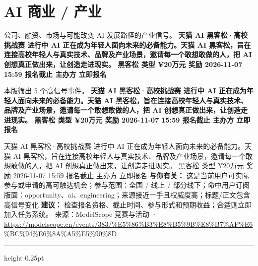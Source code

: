 \documentclass[10.5pt]{ctexart}
\begin{document}
\section*{AI 商业 / 产业}
{\color{ormuted} 公司、融资、市场与可能改变 AI 发展路径的产业信号。}
\vspace{2mm}
{\LARGE\bfseries 天猫 AI 黑客松·高校挑战赛 进行中 AI 正在成为年轻人面向未来的必备能力。天猫 AI 黑客松，旨在连接高校年轻人与真实技术、品牌及产业场景，邀请每一个敢想敢做的人，把 AI 创想真正做出来，让创造走进现实。 黑客松 类型 ¥20万元 奖励 2026-11-07 15:59 报名截止 主办方 立即报名}\par
\vspace{1mm}
{\color{ormuted} 本版筛出 5 个高信号事件。}
\vspace{3mm}
{\Large\bfseries 天猫 AI 黑客松·高校挑战赛 进行中 AI 正在成为年轻人面向未来的必备能力。天猫 AI 黑客松，旨在连接高校年轻人与真实技术、品牌及产业场景，邀请每一个敢想敢做的人，把 AI 创想真正做出来，让创造走进现实。 黑客松 类型 ¥20万元 奖励 2026-11-07 15:59 报名截止 主办方 立即报名}\par
天猫 AI 黑客松·高校挑战赛 进行中 AI 正在成为年轻人面向未来的必备能力。天猫 AI 黑客松，旨在连接高校年轻人与真实技术、品牌及产业场景，邀请每一个敢想敢做的人，把 AI 创想真正做出来，让创造走进现实。 黑客松 类型 ¥20万元 奖励 2026-11-07 15:59 报名截止 主办方 立即报名
\textbf{与你有关：} 这是当前用户可实际参与或申请的高可触达机会；参与范围：全国 / 线上 / 部分线下；命中用户订阅版面：opportunity、ai、engineering；来源接近一手且权威度高；标题/正文包含高信号变化
\textbf{建议：} 检查报名资格、截止时间、参与形式和预期收益；合适则立即加入任务系统。
{\footnotesize\color{ormuted} 来源：ModelScope 竞赛与活动 · \url{https://modelscope.cn/events/383/%E5%86%B3%E8%B5%9B%E8%B7%AF%E6%BC%94%E6%8A%A5%E5%90%8D}}
\vspace{4mm}
\hrule height 0.25pt
\vspace{3mm}
\end{document}

